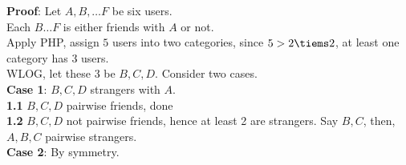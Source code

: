 \textbf{Proof}: Let $A, B, \hdots F$ be six users. \\

Each  $B \hdots F$ is either friends with $A$ or not. \\

Apply PHP, assign $5$ users into two categories, since $5 > 2 \tiems 2$, at least one category has 3 users. \\

WLOG, let these 3 be $B, C, D$. Consider two cases. \\

\textbf{Case 1}: $B, C, D$ strangers with $A$.\\

\textbf{1.1} $B, C, D$ pairwise friends, done \\
\textbf{1.2} $B, C, D$ not pairwise friends, hence at least 2 are strangers. Say $B, C$, then, $A, B, C$ pairwise strangers. \\

\textbf{Case 2}: By symmetry.





